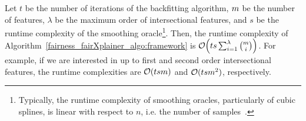 \begin{proposition} Let $ t $ be the number of iterations of the backfitting algorithm, $ m $ be the number of features, $ \lambda $ be the maximum order of intersectional features, and $ s $ be the runtime complexity of the smoothing oracle\footnote{Typically, the runtime complexity of smoothing oracles, particularly of cubic splines, is linear with respect to $ n $, i.e. the number of samples~\cite{toraichi1987computational}.}.	Then, the runtime complexity of Algorithm~\ref{fairness_fairXplainer_algo:framework} is $ \mathcal{O}\Big(ts\sum_{i=1}^{\lambda} {m \choose i}\Big)$.  For example, if we are interested in up to first and second order intersectional features, the runtime complexities are $\mathcal{O}(tsm)$ and $\mathcal{O}(tsm^2)$, respectively. 
\end{proposition}
 











 